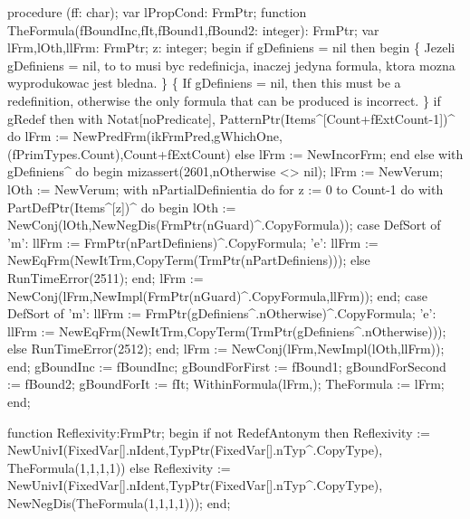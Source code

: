 \nwenddocs{}\endmoddef\nwstartdeflinemarkup{}\nwenddeflinemarkup
procedure (ff: char);
var
   lPropCond: FrmPtr;
   function TheFormula(fBoundInc,fIt,fBound1,fBound2: integer): FrmPtr;
   var
      lFrm,lOth,llFrm: FrmPtr;
      z: integer;
   begin
      if gDefiniens = nil then
      begin
         \{ Jezeli gDefiniens = nil, to to musi byc redefinicja, inaczej
           jedyna formula, ktora mozna wyprodukowac jest bledna.
         \}
         \{ If gDefiniens = nil, then this must be a redefinition, otherwise
           the only formula that can be produced is incorrect. \}
         if gRedef then
            with Notat[noPredicate], PatternPtr(Items^[Count+fExtCount-1])^ do
            lFrm := NewPredFrm(ikFrmPred,gWhichOne,(fPrimTypes.Count),Count+fExtCount)
         else lFrm := NewIncorFrm;
      end
      else
         with gDefiniens^ do
      begin
         mizassert(2601,nOtherwise <> nil);
         lFrm := NewVerum; lOth := NewVerum;
         with nPartialDefinientia do
            for z := 0 to Count-1 do
               with PartDefPtr(Items^[z])^ do
            begin
               lOth := NewConj(lOth,NewNegDis(FrmPtr(nGuard)^.CopyFormula));
               case DefSort of
                  'm': llFrm := FrmPtr(nPartDefiniens)^.CopyFormula;
                  'e': llFrm := NewEqFrm(NewItTrm,CopyTerm(TrmPtr(nPartDefiniens)));
               else RunTimeError(2511);
               end;
               lFrm := NewConj(lFrm,NewImpl(FrmPtr(nGuard)^.CopyFormula,llFrm));
            end;
         case DefSort of
            'm': llFrm := FrmPtr(gDefiniens^.nOtherwise)^.CopyFormula;
            'e': llFrm := NewEqFrm(NewItTrm,CopyTerm(TrmPtr(gDefiniens^.nOtherwise)));
         else RunTimeError(2512);
         end;
         lFrm := NewConj(lFrm,NewImpl(lOth,llFrm));
      end;
      gBoundInc := fBoundInc;
      gBoundForFirst := fBound1; gBoundForSecond := fBound2;
      gBoundForIt := fIt;
      WithinFormula(lFrm,);
      TheFormula := lFrm;
   end;
   
   function Reflexivity:FrmPtr;
   begin
      if not RedefAntonym then
         Reflexivity := 
            NewUnivI(FixedVar[].nIdent,TypPtr(FixedVar[].nTyp^.CopyType),
                     TheFormula(1,1,1,1))
      else Reflexivity := 
         NewUnivI(FixedVar[].nIdent,TypPtr(FixedVar[].nTyp^.CopyType),
                  NewNegDis(TheFormula(1,1,1,1)));
   end;
   
